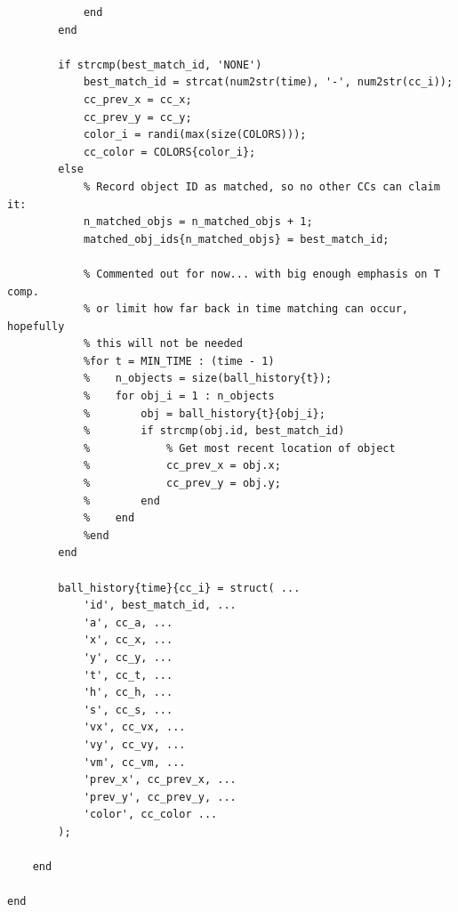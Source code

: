 \documentclass[12pt,a4paper]{article}
\begin{document}
\begin{appendices}
\begin{verbatim}
            end
        end
        
        if strcmp(best_match_id, 'NONE')
            best_match_id = strcat(num2str(time), '-', num2str(cc_i));
            cc_prev_x = cc_x;
            cc_prev_y = cc_y;
            color_i = randi(max(size(COLORS)));
            cc_color = COLORS{color_i};
        else
            % Record object ID as matched, so no other CCs can claim it:
            n_matched_objs = n_matched_objs + 1;
            matched_obj_ids{n_matched_objs} = best_match_id;
            
            % Commented out for now... with big enough emphasis on T comp.
            % or limit how far back in time matching can occur, hopefully
            % this will not be needed
            %for t = MIN_TIME : (time - 1)
            %    n_objects = size(ball_history{t});
            %    for obj_i = 1 : n_objects
            %        obj = ball_history{t}{obj_i};
            %        if strcmp(obj.id, best_match_id)
            %            % Get most recent location of object
            %            cc_prev_x = obj.x;
            %            cc_prev_y = obj.y;
            %        end
            %    end
            %end
        end
        
        ball_history{time}{cc_i} = struct( ...
            'id', best_match_id, ...
            'a', cc_a, ...
            'x', cc_x, ...
            'y', cc_y, ...
            't', cc_t, ...
            'h', cc_h, ...
            's', cc_s, ...
            'vx', cc_vx, ...
            'vy', cc_vy, ...
            'vm', cc_vm, ...
            'prev_x', cc_prev_x, ...
            'prev_y', cc_prev_y, ...
            'color', cc_color ...
        );
    
    end

end
\end{verbatim}

\end{appendices}
\end{document}
